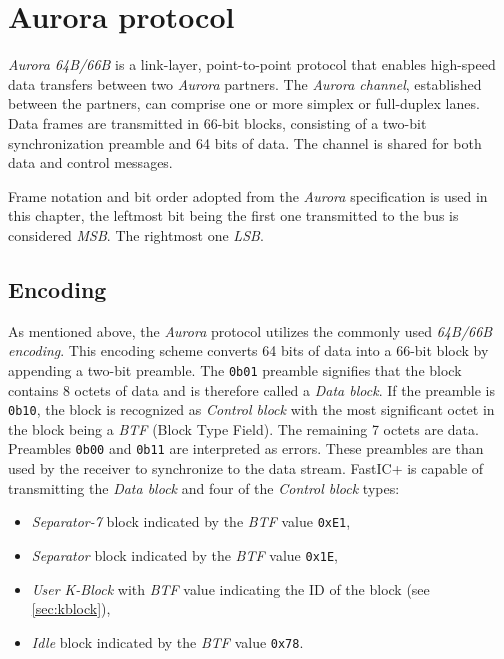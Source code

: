 
\chapter{Aurora protocol}
\emph{Aurora 64B/66B} is a link-layer, point-to-point protocol that enables high-speed data transfers between two \emph{Aurora} partners. The \emph{Aurora channel}, established between the partners, can comprise one or more simplex or full-duplex lanes. Data frames are transmitted in 66-bit blocks, consisting of a two-bit synchronization preamble and 64 bits of data. The channel is shared for both data and control messages. 

Frame notation and bit order adopted from the \emph{Aurora} specification \cite{auroraSpec} is used in this chapter, the leftmost bit being the first one transmitted to the bus is considered \emph{MSB}. The rightmost one \emph{LSB}.
%
\section{Encoding}
As mentioned above, the \emph{Aurora} protocol utilizes the commonly used \emph{64B/66B encoding}. This encoding scheme converts 64 bits of data into a 66-bit block by appending a two-bit preamble. The \verb|0b01| preamble signifies that the block contains 8 octets of data and is therefore called a \emph{Data block}. If the preamble is \verb|0b10|, the block is recognized as \emph{Control block} with the most significant octet in the block being a \emph{BTF} (Block Type Field). The remaining 7 octets are data. Preambles \verb|0b00| and \verb|0b11| are interpreted as errors. These preambles are than used by the receiver to synchronize to the data stream.
\newline\newline
FastIC+ is capable of transmitting the \emph{Data block} and four of the \emph{Control block} types:
\begin{itemize}
    \item \emph{Separator-7} block indicated by the \emph{BTF} value \verb|0xE1|,
    \item \emph{Separator} block indicated by the \emph{BTF} value \verb|0x1E|,
    \item \emph{User K-Block} with \emph{BTF} value indicating the ID of the block (see \ref{sec:kblock}),
    \item \emph{Idle} block indicated by the \emph{BTF} value \verb|0x78|.
\end{itemize}

